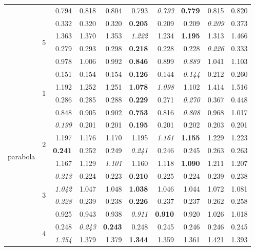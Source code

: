 \documentclass[authoryear, review, 11pt]{elsarticle}
\begin{document}
\begin{table}
\begin{center}
{\begin{tabular}{ccrrrrrrrr}
   &  & 0.794 & 0.818 & 0.804 & 0.793 & \emph{0.793} & \textbf{0.779} & 0.815 & 0.820 \\ 
  \cline{3-10}
   & \multirow{4}{*}{5} & 0.332 & 0.320 & 0.320 & \textbf{0.205} & 0.209 & 0.209 & \emph{0.209} & 0.373 \\ 
   &  & 1.363 & 1.370 & 1.353 & \emph{1.222} & 1.234 & \textbf{1.195} & 1.313 & 1.466 \\ 
   &  & 0.279 & 0.293 & 0.298 & \textbf{0.218} & 0.228 & 0.228 & \emph{0.226} & 0.333 \\ 
   &  & 0.978 & 1.006 & 0.992 & \textbf{0.846} & 0.899 & \emph{0.889} & 1.041 & 1.103 \\ 
  \hline
  \multirow{20}{*}{parabola} & \multirow{4}{*}{1} & 0.151 & 0.154 & 0.154 & \textbf{0.126} & 0.144 & \emph{0.144} & 0.212 & 0.260 \\ 
   &  & 1.192 & 1.252 & 1.251 & \textbf{1.078} & \emph{1.098} & 1.102 & 1.414 & 1.516 \\ 
   &  & 0.286 & 0.285 & 0.288 & \textbf{0.229} & 0.271 & \emph{0.270} & 0.367 & 0.448 \\ 
   &  & 0.848 & 0.905 & 0.902 & \textbf{0.753} & 0.816 & \emph{0.808} & 0.968 & 1.017 \\ 
  \cline{3-10}
   & \multirow{4}{*}{2} & \emph{0.199} & 0.201 & 0.201 & \textbf{0.195} & 0.201 & 0.202 & 0.203 & 0.201 \\ 
   &  & 1.197 & 1.176 & 1.170 & 1.195 & \emph{1.161} & \textbf{1.155} & 1.229 & 1.223 \\ 
   &  & \textbf{0.241} & 0.252 & 0.249 & \emph{0.241} & 0.246 & 0.245 & 0.263 & 0.263 \\ 
   &  & 1.167 & 1.129 & \emph{1.101} & 1.160 & 1.118 & \textbf{1.090} & 1.211 & 1.207 \\ 
  \cline{3-10}
   & \multirow{4}{*}{3} & \emph{0.213} & 0.224 & 0.223 & \textbf{0.210} & 0.225 & 0.224 & 0.239 & 0.238 \\ 
   &  & \emph{1.042} & 1.047 & 1.048 & \textbf{1.038} & 1.046 & 1.044 & 1.072 & 1.081 \\ 
   &  & \emph{0.228} & 0.239 & 0.238 & \textbf{0.226} & 0.237 & 0.237 & 0.262 & 0.258 \\ 
   &  & 0.925 & 0.943 & 0.938 & \emph{0.911} & \textbf{0.910} & 0.920 & 1.026 & 1.018 \\ 
  \cline{3-10}
   & \multirow{4}{*}{4} & 0.248 & \emph{0.243} & \textbf{0.243} & 0.248 & 0.245 & 0.246 & 0.246 & 0.245 \\ 
   &  & \emph{1.354} & 1.379 & 1.379 & \textbf{1.344} & 1.359 & 1.361 & 1.421 & 1.393 \\ 

\end{tabular}}
\end{center}
\end{table}
\end{document}
